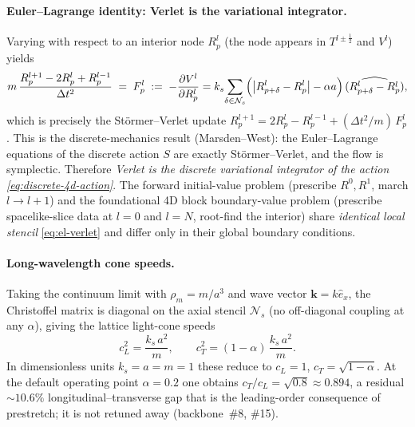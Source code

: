 \paragraph{Euler--Lagrange identity: Verlet is the variational integrator.}
Varying  with respect to an interior node $R_p^l$ (the node appears in $T^{l\pm\frac{1}{2}}$ and $V^l$) yields
\begin{equation}
  m\,\frac{R_p^{l+1} - 2R_p^l + R_p^{l-1}}{\Delta t^2}
  \;=\;
  F_p^l
  \;:=\;
  -\frac{\partial V^l}{\partial R_p^l}
  = k_s\!\sum_{\delta\in\mathcal{N}_s}
    \Bigl(\bigl|R_{p+\delta}^l - R_p^l\bigr| - \alpha a\Bigr)
    \,\widehat{(R_{p+\delta}^l - R_p^l)},
  \label{eq:el-verlet}
\end{equation}
which is precisely the Störmer--Verlet update $R_p^{l+1} = 2R_p^l - R_p^{l-1} + (\Delta t^2/m)\,F_p^l$.
This is the discrete-mechanics result (Marsden--West): the Euler--Lagrange equations of the discrete action $S$ are exactly Störmer--Verlet, and the flow is symplectic.
Therefore \emph{Verlet is the discrete variational integrator of the action \eqref{eq:discrete-4d-action}}.
The forward initial-value problem (prescribe $R^0, R^1$, march $l\to l+1$) and the foundational 4D block boundary-value problem (prescribe spacelike-slice data at $l=0$ and $l=N$, root-find the interior) share \emph{identical local stencil} \eqref{eq:el-verlet} and differ only in their global boundary conditions.

\paragraph{Long-wavelength cone speeds.}
Taking the continuum limit with $\rho_m = m/a^3$ and wave vector $\mathbf{k}=k\hat{e}_x$, the Christoffel matrix is diagonal on the axial stencil $\mathcal{N}_s$ (no off-diagonal coupling at any $\alpha$), giving the lattice light-cone speeds
\begin{equation}
  c_L^2 = \frac{k_s\,a^2}{m},
  \qquad
  c_T^2 = (1-\alpha)\,\frac{k_s\,a^2}{m}.
  \label{eq:cone-speeds}
\end{equation}
In dimensionless units $k_s=a=m=1$ these reduce to $c_L=1$, $c_T=\sqrt{1-\alpha}$.
At the default operating point $\alpha=0.2$ one obtains $c_T/c_L=\sqrt{0.8}\approx 0.894$, a residual $\sim 10.6\%$ longitudinal--transverse gap that is the leading-order consequence of prestretch; it is not retuned away (backbone~\#8, \#15).

